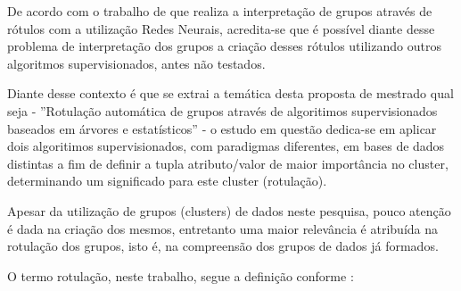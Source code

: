 De acordo com o trabalho de  que realiza a interpretação de grupos através de rótulos com a utilização Redes Neurais, acredita-se que é possível diante desse problema de interpretação dos grupos a criação desses rótulos utilizando outros algoritmos supervisionados, antes não testados.  

Diante desse contexto é que se extrai a temática desta proposta de mestrado qual seja - ''Rotulação automática de grupos através de algoritimos supervisionados baseados em árvores e estatísticos'' - o estudo em questão dedica-se em aplicar dois algoritimos supervisionados, com paradigmas diferentes,  em bases de dados distintas a fim de  definir a tupla atributo/valor de maior importância no cluster, determinando um significado para este cluster (rotulação).

Apesar da utilização de grupos (clusters) de dados neste pesquisa, pouco atenção é dada na criação dos mesmos, entretanto uma maior relevância é atribuída na rotulação dos grupos, isto é, na compreensão dos grupos de dados já formados. 

O termo rotulação, neste trabalho, segue a definição conforme : 

